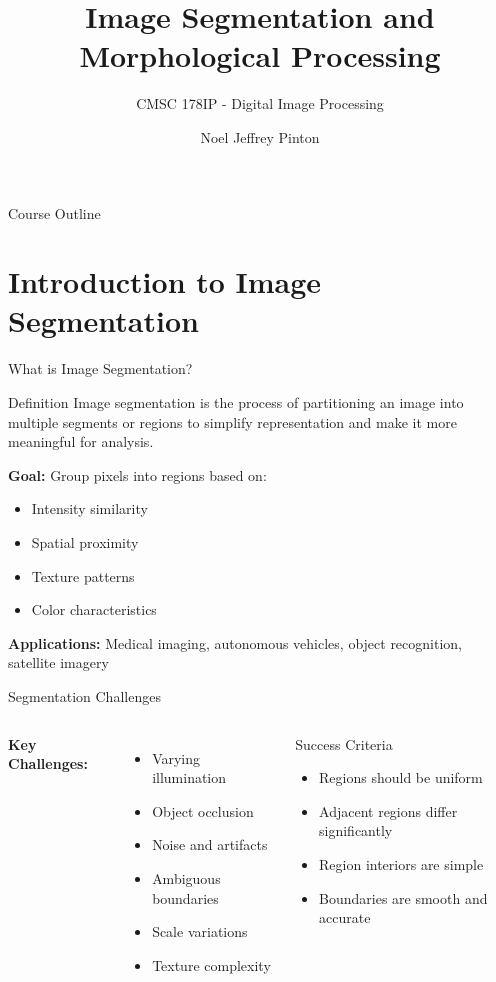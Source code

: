 \documentclass[aspectratio=169,10pt]{beamer}
\title{Image Segmentation and Morphological Processing}
\subtitle{CMSC 178IP - Digital Image Processing}
\author{Noel Jeffrey Pinton}
\institute{University of the Philippines - Cebu\\Department of Computer Science}
\date{}
\begin{document}
\begin{frame}
\titlepage
\end{frame}

\begin{frame}{Course Outline}
\tableofcontents
\end{frame}

\section{Introduction to Image Segmentation}

\begin{frame}{What is Image Segmentation?}
\begin{alertblock}{Definition}
Image segmentation is the process of partitioning an image into multiple segments or regions to simplify representation and make it more meaningful for analysis.
\end{alertblock}

\textbf{Goal:} Group pixels into regions based on:
\begin{itemize}
\item Intensity similarity
\item Spatial proximity
\item Texture patterns
\item Color characteristics
\end{itemize}

\vspace{0.3cm}
\textbf{Applications:}
Medical imaging, autonomous vehicles, object recognition, satellite imagery
\end{frame}

\begin{frame}{Segmentation Challenges}
\begin{columns}
\textbf{Key Challenges:}
\begin{itemize}
\item Varying illumination
\item Object occlusion
\item Noise and artifacts
\item Ambiguous boundaries
\item Scale variations
\item Texture complexity
\end{itemize}

\begin{block}{Success Criteria}
\begin{itemize}
\item Regions should be uniform
\item Adjacent regions differ significantly
\item Region interiors are simple
\item Boundaries are smooth and accurate
\end{itemize}
\end{block}
\end{columns}
\end{frame}
\end{document}
